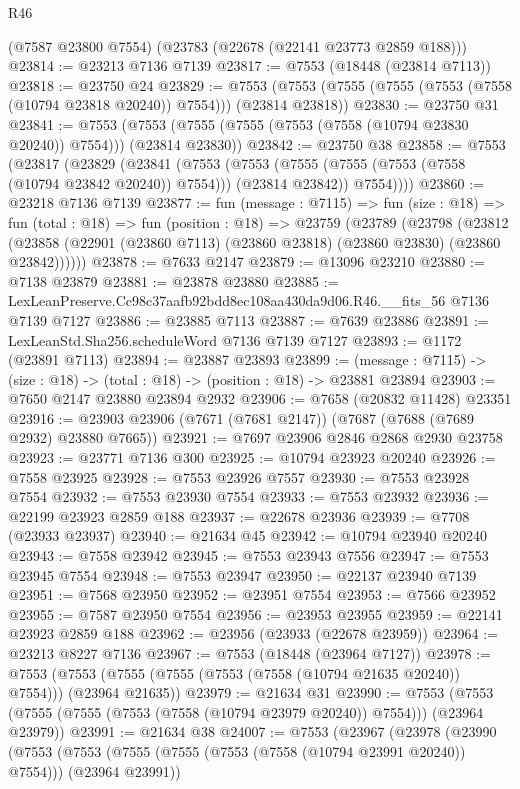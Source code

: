 \begin{lexlean}{R46}
\begin{coremodule}
    (@7587 @23800 @7554)
    (@23783 (@22678 (@22141 @23773 @2859 @188)))
@23814 := @23213 @7136 @7139
@23817 := @7553 (@18448 (@23814 @7113))
@23818 := @23750 @24
@23829 := @7553 (@7553 (@7555 (@7555 (@7553 (@7558 (@10794 @23818 @20240)) @7554))) (@23814 @23818))
@23830 := @23750 @31
@23841 := @7553 (@7553 (@7555 (@7555 (@7553 (@7558 (@10794 @23830 @20240)) @7554))) (@23814 @23830))
@23842 := @23750 @38
@23858 := @7553
    (@23817
      (@23829
        (@23841
          (@7553
            (@7553 (@7555 (@7555 (@7553 (@7558 (@10794 @23842 @20240)) @7554))) (@23814 @23842))
            @7554))))
@23860 := @23218 @7136 @7139
@23877 := fun (message : @7115) =>
  fun (size : @18) =>
  fun (total : @18) =>
  fun (position : @18) =>
  @23759
    (@23789
      (@23798
        (@23812 (@23858 (@22901 (@23860 @7113) (@23860 @23818) (@23860 @23830) (@23860 @23842))))))
@23878 := @7633 @2147
@23879 := @13096 @23210
@23880 := @7138 @23879
@23881 := @23878 @23880
@23885 := LexLeanPreserve.Cc98c37aafb92bdd8ec108aa430da9d06.R46.__fits_56 @7136 @7139 @7127
@23886 := @23885 @7113
@23887 := @7639 @23886
@23891 := LexLeanStd.Sha256.scheduleWord @7136 @7139 @7127
@23893 := @1172 (@23891 @7113)
@23894 := @23887 @23893
@23899 := (message : @7115) -> (size : @18) -> (total : @18) -> (position : @18) -> @23881 @23894
@23903 := @7650 @2147 @23880 @23894 @2932
@23906 := @7658 (@20832 @11428) @23351
@23916 := @23903 @23906 (@7671 (@7681 @2147)) (@7687 (@7688 (@7689 @2932) @23880 @7665))
@23921 := @7697 @23906 @2846 @2868 @2930 @23758
@23923 := @23771 @7136 @300
@23925 := @10794 @23923 @20240
@23926 := @7558 @23925
@23928 := @7553 @23926 @7557
@23930 := @7553 @23928 @7554
@23932 := @7553 @23930 @7554
@23933 := @7553 @23932
@23936 := @22199 @23923 @2859 @188
@23937 := @22678 @23936
@23939 := @7708 (@23933 @23937)
@23940 := @21634 @45
@23942 := @10794 @23940 @20240
@23943 := @7558 @23942
@23945 := @7553 @23943 @7556
@23947 := @7553 @23945 @7554
@23948 := @7553 @23947
@23950 := @22137 @23940 @7139
@23951 := @7568 @23950
@23952 := @23951 @7554
@23953 := @7566 @23952
@23955 := @7587 @23950 @7554
@23956 := @23953 @23955
@23959 := @22141 @23923 @2859 @188
@23962 := @23956 (@23933 (@22678 @23959))
@23964 := @23213 @8227 @7136
@23967 := @7553 (@18448 (@23964 @7127))
@23978 := @7553 (@7553 (@7555 (@7555 (@7553 (@7558 (@10794 @21635 @20240)) @7554))) (@23964 @21635))
@23979 := @21634 @31
@23990 := @7553 (@7553 (@7555 (@7555 (@7553 (@7558 (@10794 @23979 @20240)) @7554))) (@23964 @23979))
@23991 := @21634 @38
@24007 := @7553
    (@23967
      (@23978
        (@23990
          (@7553
            (@7553 (@7555 (@7555 (@7553 (@7558 (@10794 @23991 @20240)) @7554))) (@23964 @23991))

\end{coremodule}
\end{lexlean}
